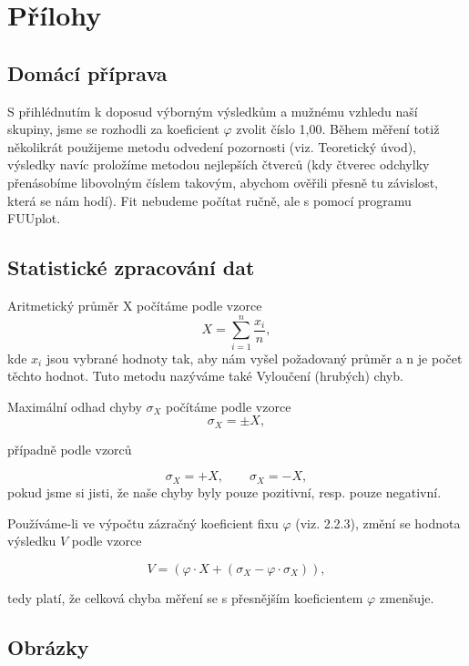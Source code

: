 \documentclass[english]{article}
\begin{document}
\section{Přílohy}
\subsection{Domácí příprava}
S přihlédnutím k doposud výborným výsledkům a mužnému vzhledu naší skupiny, jsme se rozhodli za koeficient $\varphi$ zvolit číslo 1,00. Během měření totiž několikrát použijeme metodu odvedení pozornosti (viz. Teoretický úvod), výsledky navíc proložíme metodou nejlepších čtverců (kdy čtverec odchylky přenásobíme libovolným číslem takovým, abychom ověřili přesně tu závislost, která se nám hodí). Fit nebudeme počítat ručně, ale s pomocí programu FUUplot.
\subsection{Statistické zpracování dat}
Aritmetický průměr X počítáme podle vzorce
\begin{equation}\label{eq:ch1}
X = \sum\limits_{i=1}^{n} \frac{x_i}{n},
\end{equation}
kde $x_i$ jsou vybrané hodnoty tak, aby nám vyšel požadovaný průměr a n je počet těchto hodnot. Tuto metodu nazýváme také Vyloučení (hrubých) chyb.

Maximální odhad chyby $\sigma_X$ počítáme podle vzorce
\begin{equation}\label{eq:ch2}
\sigma_X = \pm X,
\end{equation}

případně podle vzorců

\begin{equation}\label{eq:ch3}
\sigma_X = + X, \qquad \sigma_X = - X,
\end{equation}
pokud jsme si jisti, že naše chyby byly pouze pozitivní, resp. pouze negativní.

Používáme-li ve výpočtu zázračný koeficient fixu $\varphi$ (viz. 2.2.3), změní se hodnota výsledku $V$ podle vzorce

\begin{equation}\label{eq:ch4}
V = \left(\varphi \cdot X + (\sigma_X - \varphi \cdot \sigma_X ) \right),
\end{equation}

tedy platí, že celková chyba měření se s přesnějším koeficientem $\varphi$ zmenšuje.


\clearpage
\subsection{Obrázky}
\end{document}

